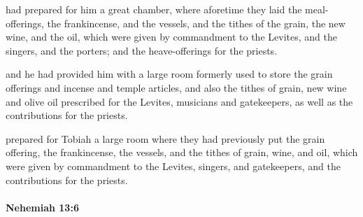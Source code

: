 			\begin{versebox}
					\item[BHS] 
					\item[LXX] 
					\item[ASV] had prepared for him a great chamber, where aforetime they laid the meal-offerings, the frankincense, and the vessels, and the tithes of the grain, the new wine, and the oil, which were given by commandment to the Levites, and the singers, and the porters; and the heave-offerings for the priests.
					\item[NIV] and he had provided him with a large room formerly used to store the grain offerings and incense and temple articles, and also the tithes of grain, new wine and olive oil prescribed for the Levites, musicians and gatekeepers, as well as the contributions for the priests.
					\item[NRSV] prepared for Tobiah a large room where they had previously put the grain offering, the frankincense, the vessels, and the tithes of grain, wine, and oil, which were given by commandment to the Levites, singers, and gatekeepers, and the contributions for the priests.
			\end{versebox}

		\paragraph{Nehemiah 13:6} %
			\label{NEHEMIAH-13-6}

